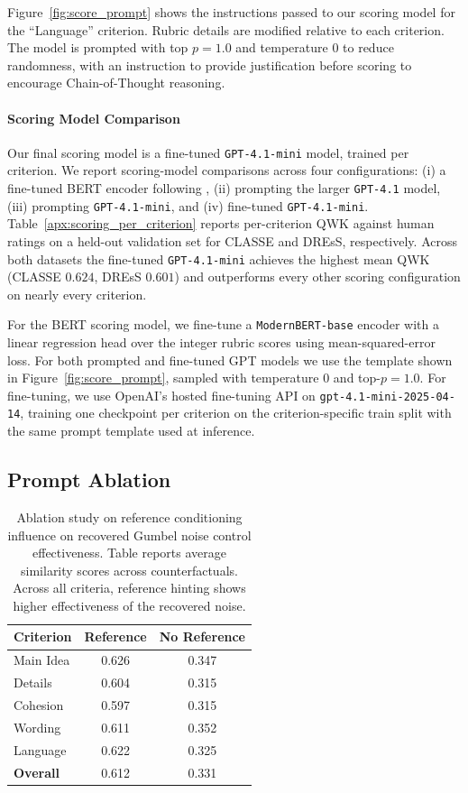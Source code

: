 \documentclass[11pt]{article}
\begin{document}
Figure~\ref{fig:score_prompt} shows the instructions passed to our scoring model for the ``Language'' criterion. Rubric details are modified relative to each criterion. The model is prompted with top $p=1.0$ and temperature $0$ to reduce randomness, with an instruction to provide justification before scoring to encourage Chain-of-Thought reasoning.

\paragraph{Scoring Model Comparison} Our final scoring model is a fine-tuned \texttt{GPT-4.1-mini} model, trained per criterion. We report scoring-model comparisons across four configurations: (i) a fine-tuned BERT encoder following \cite{fernandez_automated_2022}, (ii) prompting the larger \texttt{GPT-4.1} model, (iii) prompting \texttt{GPT-4.1-mini}, and (iv) fine-tuned \texttt{GPT-4.1-mini}. Table~\ref{apx:scoring_per_criterion} reports per-criterion QWK against human ratings on a held-out validation set for CLASSE and DREsS, respectively. Across both datasets the fine-tuned \texttt{GPT-4.1-mini} achieves the highest mean QWK (CLASSE $0.624$, DREsS $0.601$) and outperforms every other scoring configuration on nearly every criterion.

For the BERT scoring model, we fine-tune a \texttt{ModernBERT-base} encoder with a linear regression head over the integer rubric scores using mean-squared-error loss. For both prompted and fine-tuned GPT models we use the template shown in Figure~\ref{fig:score_prompt}, sampled with temperature $0$ and top-$p=1.0$. For fine-tuning, we use OpenAI's hosted fine-tuning API on \texttt{gpt-4.1-mini-2025-04-14}, training one checkpoint per criterion on the criterion-specific train split with the same prompt template used at inference.

\subsection{Prompt Ablation} \label{apx:prompt-ablate}

\begin{table}[t]
\centering
\small
\begin{tabular}{lcc}
\toprule
\textbf{Criterion} & \textbf{Reference} & \textbf{No Reference} \\
\midrule
Main Idea  & 0.626 & 0.347 \\
Details    & 0.604 & 0.315 \\
Cohesion   & 0.597 & 0.315 \\
Wording    & 0.611 & 0.352 \\
Language   & 0.622 & 0.325 \\
\midrule
\textbf{Overall} & 0.612 & 0.331 \\
\bottomrule
\end{tabular}
\caption{Ablation study on reference conditioning influence on recovered Gumbel noise control effectiveness. Table reports average similarity scores across counterfactuals. Across all criteria, reference hinting shows higher effectiveness of the recovered noise.}
\label{tab:foresight_ablation}
\end{table}
\end{document}
